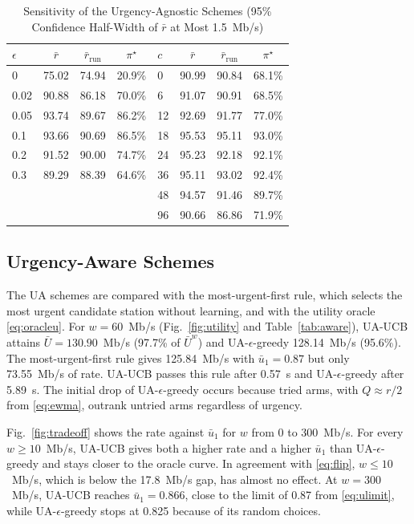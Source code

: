 \documentclass[journal]{IEEEtran}
\theoremstyle{definition}
\theoremstyle{remark}
\theoremstyle{plain}
\begin{document}
\begin{table}[t]
\caption{Sensitivity of the Urgency-Agnostic Schemes (95\% Confidence Half-Width of $\bar{r}$ at Most 1.5~Mb/s)}
\label{tab:sensitivity}
\centering
\footnotesize
\setlength{\tabcolsep}{4pt}
\begin{tabular}{@{}lccc@{\hspace{12pt}}lccc@{}}
\toprule
$\epsilon$ & $\bar{r}$ & $\bar{r}_{\mathrm{run}}$ & $\pi^\star$ & $c$ & $\bar{r}$ & $\bar{r}_{\mathrm{run}}$ & $\pi^\star$\\
\midrule
0 & 75.02 & 74.94 & 20.9\% & 0 & 90.99 & 90.84 & 68.1\%\\
0.02 & 90.88 & 86.18 & 70.0\% & 6 & 91.07 & 90.91 & 68.5\%\\
0.05 & 93.74 & 89.67 & 86.2\% & 12 & 92.69 & 91.77 & 77.0\%\\
0.1 & 93.66 & 90.69 & 86.5\% & 18 & 95.53 & 95.11 & 93.0\%\\
0.2 & 91.52 & 90.00 & 74.7\% & 24 & 95.23 & 92.18 & 92.1\%\\
0.3 & 89.29 & 88.39 & 64.6\% & 36 & 95.11 & 93.02 & 92.4\%\\
 & & & & 48 & 94.57 & 91.46 & 89.7\%\\
 & & & & 96 & 90.66 & 86.86 & 71.9\%\\
\bottomrule
\end{tabular}
\end{table}

\subsection{Urgency-Aware Schemes}
The UA schemes are compared with the most-urgent-first rule, which selects the most urgent candidate station without learning, and with the utility oracle \eqref{eq:oracleu}. For $w=60$~Mb/s (Fig.~\ref{fig:utility} and Table~\ref{tab:aware}), UA-UCB attains $\bar{U}=130.90$~Mb/s (97.7\% of $\bar{U}^w$) and UA-$\epsilon$-greedy 128.14~Mb/s (95.6\%). The most-urgent-first rule gives 125.84~Mb/s with $\bar{u}_1=0.87$ but only 73.55~Mb/s of rate. UA-UCB passes this rule after 0.57~s and UA-$\epsilon$-greedy after 5.89~s. The initial drop of UA-$\epsilon$-greedy occurs because tried arms, with $Q\approx r/2$ from \eqref{eq:ewma}, outrank untried arms regardless of urgency.

Fig.~\ref{fig:tradeoff} shows the rate against $\bar{u}_1$ for $w$ from 0 to 300~Mb/s. For every $w\geq10$~Mb/s, UA-UCB gives both a higher rate and a higher $\bar{u}_1$ than UA-$\epsilon$-greedy and stays closer to the oracle curve. In agreement with \eqref{eq:flip}, $w\leq10$~Mb/s, which is below the 17.8~Mb/s gap, has almost no effect. At $w=300$~Mb/s, UA-UCB reaches $\bar{u}_1=0.866$, close to the limit of 0.87 from \eqref{eq:ulimit}, while UA-$\epsilon$-greedy stops at 0.825 because of its random choices.
\end{document}
